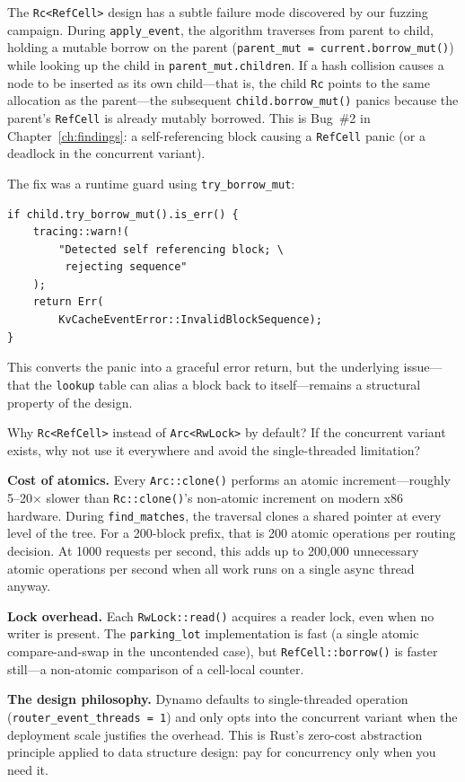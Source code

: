 \begin{bugbox}
The \texttt{Rc<RefCell>} design has a subtle failure mode discovered by our fuzzing campaign. During \texttt{apply\_event}, the algorithm traverses from parent to child, holding a mutable borrow on the parent (\texttt{parent\_mut = current.borrow\_mut()}) while looking up the child in \texttt{parent\_mut.children}. If a hash collision causes a node to be inserted as its own child---that is, the child \texttt{Rc} points to the same allocation as the parent---the subsequent \texttt{child.borrow\_mut()} panics because the parent's \texttt{RefCell} is already mutably borrowed. This is Bug~\#2 in Chapter~\ref{ch:findings}: a self-referencing block causing a \texttt{RefCell} panic (or a deadlock in the concurrent variant).

The fix was a runtime guard using \texttt{try\_borrow\_mut}:
\begin{verbatim}
if child.try_borrow_mut().is_err() {
    tracing::warn!(
        "Detected self referencing block; \
         rejecting sequence"
    );
    return Err(
        KvCacheEventError::InvalidBlockSequence);
}
\end{verbatim}
This converts the panic into a graceful error return, but the underlying issue---that the \texttt{lookup} table can alias a block back to itself---remains a structural property of the design.
\end{bugbox}

\begin{whynotbox}{Why \texttt{Rc<RefCell>} instead of \texttt{Arc<RwLock>} by default?}
If the concurrent variant exists, why not use it everywhere and avoid the single-threaded limitation?

\textbf{Cost of atomics.} Every \texttt{Arc::clone()} performs an atomic increment---roughly 5--20$\times$ slower than \texttt{Rc::clone()}'s non-atomic increment on modern x86 hardware. During \texttt{find\_matches}, the traversal clones a shared pointer at every level of the tree. For a 200-block prefix, that is 200 atomic operations per routing decision. At 1000 requests per second, this adds up to 200{,}000 unnecessary atomic operations per second when all work runs on a single async thread anyway.

\textbf{Lock overhead.} Each \texttt{RwLock::read()} acquires a reader lock, even when no writer is present. The \texttt{parking\_lot} implementation is fast (a single atomic compare-and-swap in the uncontended case), but \texttt{RefCell::borrow()} is faster still---a non-atomic comparison of a cell-local counter.

\textbf{The design philosophy.} Dynamo defaults to single-threaded operation (\texttt{router\_event\_threads = 1}) and only opts into the concurrent variant when the deployment scale justifies the overhead. This is Rust's zero-cost abstraction principle applied to data structure design: pay for concurrency only when you need it.
\end{whynotbox}

